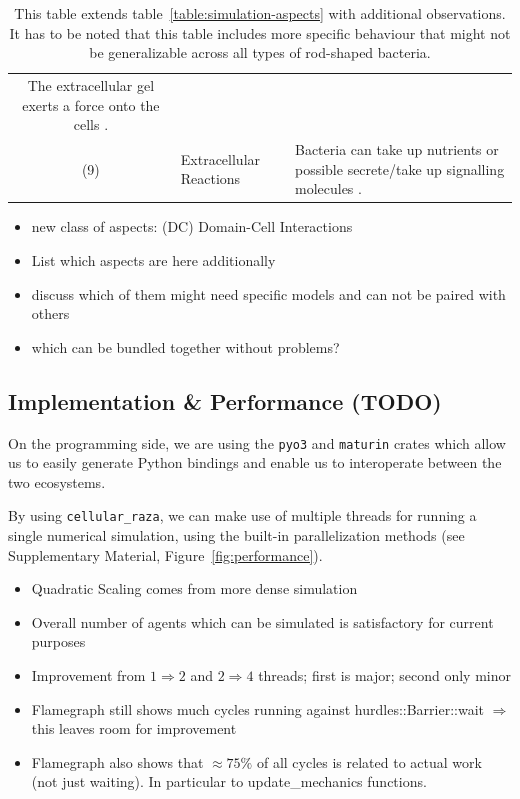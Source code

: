 \documentclass{article}
\begin{document}
\begin{table}[H]
\begin{tabularx}{\textwidth}{c l X}
            The extracellular gel exerts a force onto the cells \cite{Grant2014}.\\
        (9) & Extracellular Reactions &
            Bacteria can take up nutrients or possible secrete/take up signalling molecules
            \cite{Li2025}.\\
        \bottomrule
    \end{tabularx}
    \label{table:simulation-aspects-supplement}
    \caption{
        This table extends table~\ref{table:simulation-aspects} with additional observations.
        It has to be noted that this table includes more specific behaviour that might not be
        generalizable across all types of rod-shaped bacteria.
    }
\end{table}

\begin{itemize}
    \item new class of aspects: (DC) Domain-Cell Interactions
    \item List which aspects are here additionally
    \item discuss which of them might need specific models and can not be paired with others
    \item which can be bundled together without problems?
\end{itemize}

\subsection{Implementation \& Performance (TODO)}
\label{section:supplement-performance}

On the programming side, we are using the \texttt{pyo3} and \texttt{maturin} crates which allow us
to easily generate Python bindings and enable us to interoperate between the two ecosystems.

By using \texttt{cellular\_raza}, we can make use of multiple threads for running a single numerical
simulation, using the built-in parallelization methods (see Supplementary Material,
Figure~\ref{fig:performance}).

\begin{itemize}
    \item Quadratic Scaling comes from more dense simulation
    \item Overall number of agents which can be simulated is satisfactory for current purposes
    \item Improvement from $1 \Rightarrow 2$ and $2\Rightarrow4$ threads; first is major; second
        only minor
    \item Flamegraph still shows much cycles running against hurdles::Barrier::wait $\Rightarrow$
        this leaves room for improvement
    \item Flamegraph also shows that $\approx 75\%$ of all cycles is related to actual work (not
        just waiting).
        In particular to update\_mechanics functions.
\end{itemize}
\end{document}
